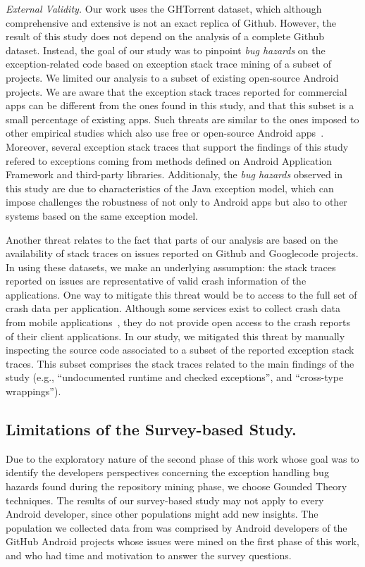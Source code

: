 \emph{External Validity.} Our work uses the GHTorrent dataset, which although 
comprehensive and extensive is not an exact replica of Github. 
However, the result of this study does not depend on the analysis of
a complete Github dataset. Instead, the goal of our study was to 
pinpoint \emph{bug hazards} on the exception-related code based on 
exception stack trace mining of a subset of projects.
We limited our analysis to a subset of existing open-source Android projects.
We are aware that the exception stack traces reported 
for commercial apps can be different from the ones found in this study, and that
this subset is a small percentage of existing apps.
Such threats are similar to the ones imposed to other empirical studies 
which also use free or open-source Android apps~\cite{Linar13,McDon13,Ruiz12}.
Moreover, several exception stack traces that support the findings of this study
refered to exceptions coming from methods defined on Android Application Framework
and third-party libraries.  Additionaly,  the \emph{bug hazards} observed in this study are due to
characteristics of the Java exception model, which can impose challenges 
the robustness of not only to Android apps but also to other systems
 based on the same exception model. 

Another threat relates to the fact that parts of our analysis 
are based on the availability of stack traces on issues reported on Github and Googlecode projects. 
In using these datasets, we make an underlying assumption: the stack traces reported on issues are 
representative of valid crash information of the applications. 
One way to mitigate this threat would be to access to the full 
set of crash data per application. Although some services exist 
to collect crash data from mobile applications~\cite{BugSe14,BugSn14,Googl14,Acra14},
they do not provide open access to the crash reports of their client applications.
In our study, we mitigated this threat by manually inspecting
the source code associated to a subset of the reported exception stack traces.
This subset comprises the stack traces related to the main findings 
of the study (e.g., ``undocumented runtime and checked exceptions'',
and ``cross-type wrappings'').

\subsection{Limitations of the Survey-based Study.}
Due to the exploratory nature of the second phase of this work whose 
goal was to identify the developers perspectives concerning the exception 
handling bug hazards found during the repository mining 
phase, we choose Gounded Theory techniques. The results of our
survey-based study may not apply to every Android developer, since other populations 
might add new insights.  The population we collected data from was comprised 
by Android developers of the GitHub 
Android projects whose issues were mined on the first phase of this work, and who had
time and motivation to answer the survey questions.

